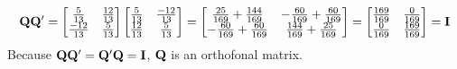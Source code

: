         \[
            \bold{Q} \bold{Q}^\prime = 
            \begin{bmatrix}
                \frac{5}{13} & \frac{12}{13} \\
                \frac{-12}{13} & \frac{5}{13}
            \end{bmatrix}
            \begin{bmatrix}
                \frac{5}{13} & \frac{-12}{13} \\
                \frac{12}{13} & \frac{5}{13}
            \end{bmatrix} =
            \begin{bmatrix}
                \frac{25}{169} + \frac{144}{169} & -\frac{60}{169} + \frac{60}{169} \\
                -\frac{60}{169} + \frac{60}{169} & \frac{144}{169} + \frac{25}{169}
            \end{bmatrix} =
            \begin{bmatrix}
                \frac{169}{169} & \frac{0}{169} \\
                \frac{0}{169} & \frac{169}{169}
            \end{bmatrix} =
            \bold{I}
        \]
        Because $\bold{Q}\bold{Q}^\prime = \bold{Q}^\prime \bold{Q} = \bold{I}$, $\bold{Q}$ is an orthofonal matrix.